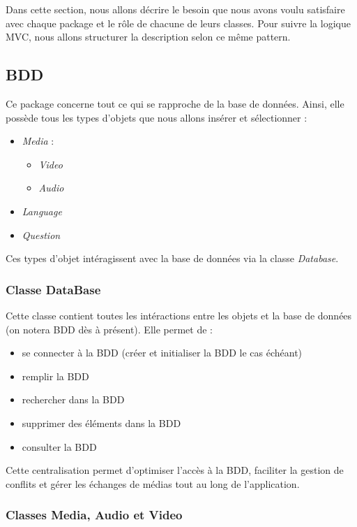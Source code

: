 Dans cette section, nous allons décrire le besoin que nous avons voulu satisfaire avec chaque package et le rôle de chacune de leurs classes. Pour suivre la logique MVC, nous allons structurer la description selon ce même pattern.


\subsection{BDD}

Ce package concerne tout ce qui se rapproche de la base de données. Ainsi, elle possède tous les types d'objets que nous allons insérer et sélectionner :
\begin{itemize}
 \item \textit{Media} :
 \begin{itemize}
  \item \textit{Video}
  \item \textit{Audio}
 \end{itemize}
 \item \textit{Language}
 \item \textit{Question}
\end{itemize}
Ces types d'objet intéragissent avec la base de données via la classe \textit{Database}.


\subsubsection{Classe DataBase}

Cette classe contient toutes les intéractions entre les objets et la base de données (on notera BDD dès à présent). Elle permet de :

\begin{itemize}
 \item se connecter à la BDD (créer et initialiser la BDD le cas échéant)
 \item remplir la BDD
 \item rechercher dans la BDD
 \item supprimer des éléments dans la BDD
 \item consulter la BDD
\end{itemize}

Cette centralisation permet d'optimiser l'accès à la BDD, faciliter la gestion de conflits et gérer les échanges de médias tout au long de l'application.

\subsubsection{Classes Media, Audio et Video}

